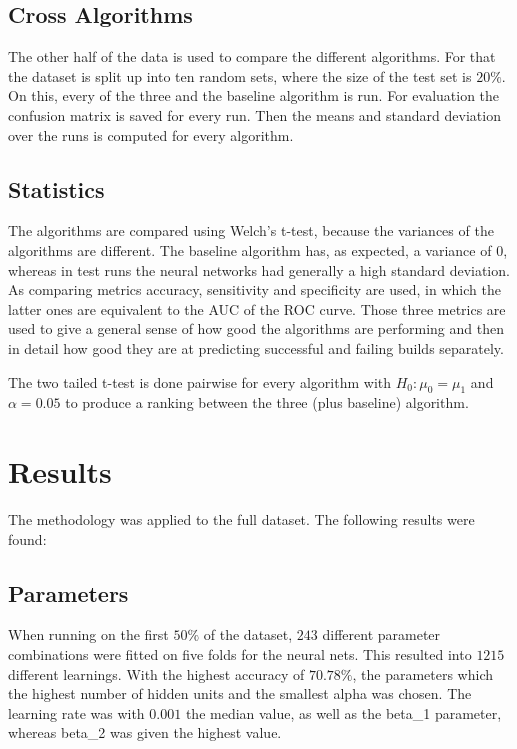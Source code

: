 \documentclass[a4paper,11pt]{article}
\begin{document}


\subsection{Cross Algorithms}

The other half of the data is used to compare the different algorithms. For that the dataset is split up into ten random sets, where the size of the test set is $20\%$. On this, every of the three and the baseline algorithm is run. For evaluation the confusion matrix is saved for every run. Then the means and standard deviation over the runs is computed for every algorithm.


\subsection{Statistics}

The algorithms are compared using Welch's t-test, because the variances of the algorithms are different. The baseline algorithm has, as expected, a variance of 0, whereas in test runs the neural networks had generally a high standard deviation. As comparing metrics accuracy, sensitivity and specificity are used, in which the latter ones are equivalent to the AUC of the ROC curve. Those three metrics are used to give a general sense of how good the algorithms are performing and then in detail how good they are at predicting successful and failing builds separately. 

The two tailed t-test is done pairwise for every algorithm with  $H_0 : \mu_0 = \mu_1$ and $\alpha=0.05$ to produce a ranking between the three (plus baseline) algorithm. 


\section{Results}

The methodology was applied to the full dataset. The following results were found:

\subsection{Parameters}

When running on the first $50\%$ of the dataset, $243$ different parameter combinations were fitted on five folds for the neural nets. This resulted into $1215$ different learnings. With the highest accuracy of $70.78\%$, the parameters which the highest number of hidden units and the smallest alpha was chosen. The learning rate was with $0.001$ the median value, as well as the  beta\_1 parameter, whereas beta\_2 was given the highest value. 
\end{document}
